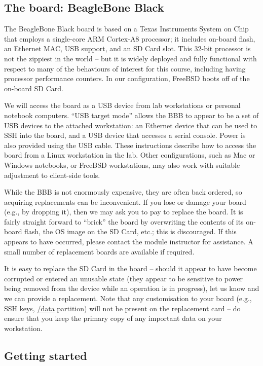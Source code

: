 \documentclass[a4paper,10pt]{article}
\begin{document}
\subsection*{The board: BeagleBone Black}

The BeagleBone Black board is based on a Texas Instruments System on Chip that
employs a single-core ARM Cortex-A8 processor; it includes on-board flash, an
Ethernet MAC, USB support, and an SD Card slot.
This 32-bit processor is not the zippiest in the world -- but it is widely
deployed and fully functional with respect to many of the behaviours of
interest for this course, including having processor performance counters.
In our configuration, FreeBSD boots off of the on-board SD Card.

We will access the board as a USB device from lab workstations or personal
notebook computers.
``USB target mode'' allows the BBB to appear to be a set of USB devices to the
attached workstation: an Ethernet device that can be used to SSH into the
board, and a USB device that accesses a serial console.
Power is also provided using the USB cable.
These instructions describe how to access the board from a Linux workstation
in the lab.
Other configurations, such as Mac or Windows notebooks, or FreeBSD
workstations, may also work with suitable adjustment to client-side tools.

While the BBB is not enormously expensive, they are often back ordered, so
acquiring replacements can be inconvenient.
If you lose or damage your board (e.g., by dropping it), then we may ask you
to pay to replace the board.
It is fairly straight forward to ``brick'' the board by overwriting the
contents of its on-board flash, the OS image on the SD Card, etc.; this is
discouraged.
If this appears to have occurred, please contact the module instructor for
assistance.
A small number of replacement boards are available if required.

It is easy to replace the SD Card in the board -- should it appear to have
become corrupted or entered an unusable state (they appear to be sensitive to
power being removed from the device while an operation is in progress), let us
know and we can provide a replacement.
Note that any customisation to your board (e.g., SSH keys, \url{/data}
partition) will not be present on the replacement card -- do ensure that you
keep the primary copy of any important data on your workstation.

\subsection*{Getting started}
\end{document}
